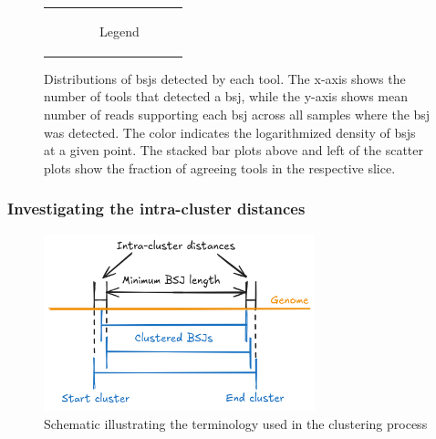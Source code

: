 \begin{figure}[H]
\begin{tabular}{cc}
                                                                                                                                 &
               \begin{subfigure}{.4\textwidth}	     \centering
                       \caption{Legend}

                   \end{subfigure}\end{tabular} \caption{Distributions of
        \gls{bsj}s detected by
        each tool.
        The x-axis shows the number of tools that detected a \gls{bsj}, while the
        y-axis shows mean number of reads supporting each \gls{bsj} across all samples
        where the \gls{bsj} was detected.
        The color indicates the logarithmized density of \gls{bsj}s at a given point.
        The stacked bar plots above and left of the scatter plots show the fraction of
        agreeing tools in the respective slice.
    }
    \label{fig:detection_density}
\end{figure}

\subsubsection{Investigating the intra-cluster distances}

\noindent{}

\begin{figure}[ht] \centering

    \includegraphics[width=0.7\textwidth]{chapters/4_results_and_discussion/figures/grouping.png}
    \caption{Schematic illustrating the terminology used in the
        clustering
        process}
    \label{fig:clustering_expl} \end{figure}

